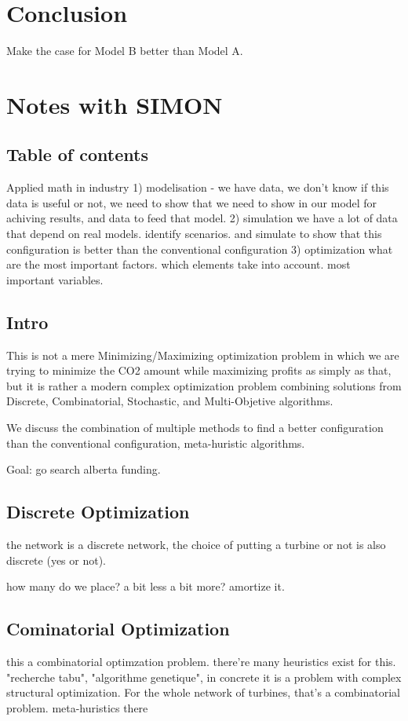 \documentclass[12pt]{article}
\begin{document}
\section{Conclusion}
Make the case for Model B better than Model A. 

\newpage

\section{Notes with SIMON}
\subsection{Table of contents}
Applied math in industry
1) modelisation
  - we have data, we don't know if this data is useful or not, we need to show that we
need to show in our model for achiving results, and data to feed that model. 
2) simulation
we have a lot of data that depend on real models. identify scenarios. and simulate to 
show that this configuration is better than the conventional configuration 
3) optimization 
what are the most important factors. which elements take into account. most important
variables. 


\subsection{Intro}
This is not a mere Minimizing/Maximizing optimization problem in which we are trying to minimize the CO2 amount while maximizing profits as simply as that, but it is rather
a modern complex optimization problem combining solutions from Discrete, Combinatorial,
Stochastic, and Multi-Objetive algorithms. 

We discuss the combination of multiple methods to find a better configuration than
the conventional configuration, meta-huristic algorithms. 

Goal: go search alberta funding. 
 

\subsection{Discrete Optimization}
the network is a discrete network, the choice of putting a turbine or not is also
discrete (yes or not). 

how many do we place? a bit less a bit more? amortize it.

\subsection{Cominatorial Optimization}
this a combinatorial optimzation problem. there're many heuristics exist for this. 
"recherche tabu", "algorithme genetique", in concrete it is a problem with complex
structural optimization. 
For the whole network of turbines, that's a combinatorial problem. meta-huristics there
\end{document}
